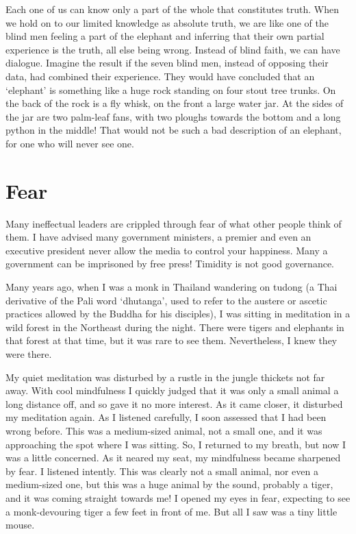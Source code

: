 ﻿\documentclass[11pt, openany]{book}
\begin{document}
Each one of us can know only a part of the whole that constitutes truth. When we hold on to our limited knowledge as absolute truth, we are like one of the blind men feeling a part of the elephant and inferring that their own partial experience is the truth, all else being wrong. Instead of blind faith, we can have dialogue. Imagine the result if the seven blind men, instead of opposing their data, had combined their experience. They would have concluded that an ‘elephant’ is something like a huge rock standing on four stout tree trunks. On the back of the rock is a fly whisk, on the front a large water jar. At the sides of the jar are two palm-leaf fans, with two ploughs towards the bottom and a long python in the middle! That would not be such a bad description of an elephant, for one who will never see one.

\section{Fear}

Many ineffectual leaders are crippled through fear of what other people think of them. I have advised many government ministers, a premier and even an executive president never allow the media to control your happiness. Many a government can be imprisoned by free press! Timidity is not good governance.

Many years ago, when I was a monk in Thailand wandering on tudong (a Thai derivative of the Pali word ‘dhutanga’, used to refer to the austere or ascetic practices allowed by the Buddha for his disciples), I was sitting in meditation in a wild forest in the Northeast during the night. There were tigers and elephants in that forest at that time, but it was rare to see them. Nevertheless, I knew they were there.

My quiet meditation was disturbed by a rustle in the jungle thickets not far away. With cool mindfulness I quickly judged that it was only a small animal a long distance off, and so gave it no more interest. As it came closer, it disturbed my meditation again. As I listened carefully, I soon assessed that I had been wrong before. This was a medium-sized animal, not a small one, and it was approaching the spot where I was sitting. So, I returned to my breath, but now I was a little concerned. As it neared my seat, my mindfulness became sharpened by fear. I listened intently. This was clearly not a small animal, nor even a medium-sized one, but this was a huge animal by the sound, probably a tiger, and it was coming straight towards me! I opened my eyes in fear, expecting to see a monk-devouring tiger a few feet in front of me. But all I saw was a tiny little mouse.
\end{document}
